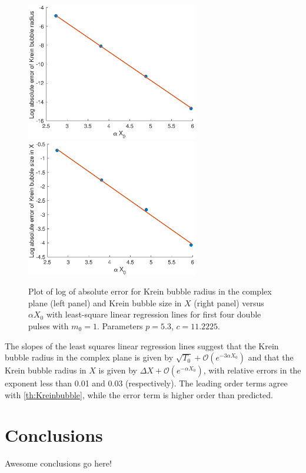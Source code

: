 \documentclass[10pt,reqno]{amsart}
\theoremstyle{plain}
\theoremstyle{definition}
\theoremstyle{remark}
\numberwithin{theorem}{section}
\numberwithin{equation}{section}
\begin{document}
\begin{figure}[H]
\begin{center}
\includegraphics[width=7.5cm]{images/KreinRadiusError.eps}
\includegraphics[width=7.5cm]{images/KreinRadiusXError.eps}
\end{center}
\caption{Plot of log of absolute error for Krein bubble radius in the complex plane (left panel) and Krein bubble size in $X$ (right panel) versus $\alpha X_0$ with least-square linear regression lines for first four double pulses with $m_0 = 1$. Parameters $p = 5.3$, $c = 11.2225$.}
\label{fig:kreinerrors}
\end{figure}
\noi The slopes of the least squares linear regression lines suggest that the Krein bubble radius in the complex plane is given by $\sqrt{T_0} + \mathcal{O}(e^{-3 \alpha X_0})$ and that the Krein bubble radius in $X$ is given by $\Delta X + \mathcal{O}(e^{-\alpha X_0})$, with relative errors in the exponent less than 0.01 and 0.03 (respectively). The leading order terms agree with \cref{th:Kreinbubble}, while the error term is higher order than predicted. 

\section{Conclusions}\label{sec:conclusions}

Awesome conclusions go here!
\end{document}

